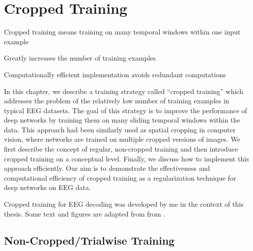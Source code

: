 \chapter{Cropped Training}\label{cropped-training}

\begin{startbox}{Cropped training means training on many temporal windows within one input example}  
\item Greatly increases the number of training examples
\item Computationally efficient implementation avoids redundant computations
\end{startbox}


    In this chapter, we describe a training strategy called ``cropped
training'' which addresses the problem of the relatively low number of
training examples in typical EEG datasets. The goal of this strategy is
to improve the performance of deep networks by training them on many
sliding temporal windows within the data. This approach had been
similarly used as spatial cropping in computer vision, where networks
are trained on multiple cropped versions of images. We first describe
the concept of regular, non-cropped training and then introduce cropped
training on a conceptual level. Finally, we discuss how to implement
this approach efficiently. Our aim is to demonstrate the effectiveness
and computational efficiency of cropped training as a regularization
technique for deep networks on EEG data.

Cropped training for EEG decoding was developed by me in the context of
this thesis. Some text and figures are adapted from from
\cite{schirrmeisterdeephbm2017}.


\section{Non-Cropped/Trialwise
Training}\label{non-croppedtrialwise-training}



